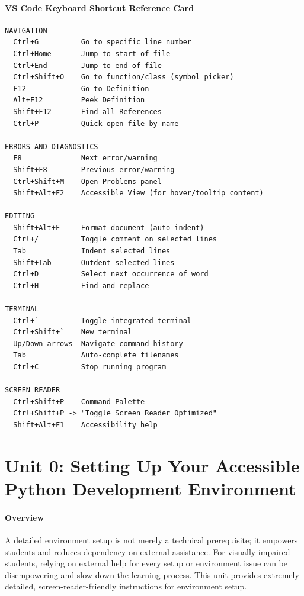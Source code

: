 \documentclass[
  justified,
  openright,
]{tufte-book}
\let\subsection\paragraph
\let\paragraph\paragraph
\let\subsection\paragraph
\let\paragraph\paragraph
\begin{document}
\subsection{VS Code Keyboard Shortcut Reference
Card}\label{vs-code-keyboard-shortcut-reference-card}

\begin{verbatim}
NAVIGATION
  Ctrl+G          Go to specific line number
  Ctrl+Home       Jump to start of file
  Ctrl+End        Jump to end of file
  Ctrl+Shift+O    Go to function/class (symbol picker)
  F12             Go to Definition
  Alt+F12         Peek Definition
  Shift+F12       Find all References
  Ctrl+P          Quick open file by name

ERRORS AND DIAGNOSTICS
  F8              Next error/warning
  Shift+F8        Previous error/warning
  Ctrl+Shift+M    Open Problems panel
  Shift+Alt+F2    Accessible View (for hover/tooltip content)

EDITING
  Shift+Alt+F     Format document (auto-indent)
  Ctrl+/          Toggle comment on selected lines
  Tab             Indent selected lines
  Shift+Tab       Outdent selected lines
  Ctrl+D          Select next occurrence of word
  Ctrl+H          Find and replace

TERMINAL
  Ctrl+`          Toggle integrated terminal
  Ctrl+Shift+`    New terminal
  Up/Down arrows  Navigate command history
  Tab             Auto-complete filenames
  Ctrl+C          Stop running program

SCREEN READER
  Ctrl+Shift+P    Command Palette
  Ctrl+Shift+P -> "Toggle Screen Reader Optimized"
  Shift+Alt+F1    Accessibility help
\end{verbatim}

\newpage

\section{Unit 0: Setting Up Your Accessible Python Development
Environment}\label{unit-0-setting-up-your-accessible-python-development-environment}

\subsection{Overview}\label{overview}

A detailed environment setup is not merely a technical prerequisite; it
empowers students and reduces dependency on external assistance. For
visually impaired students, relying on external help for every setup or
environment issue can be disempowering and slow down the learning
process. This unit provides extremely detailed, screen-reader-friendly
instructions for environment setup.
\end{document}
